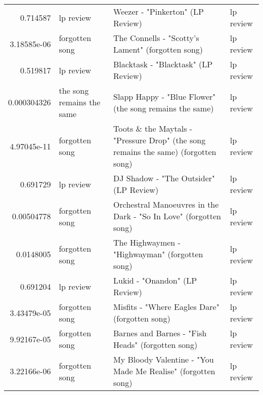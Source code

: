 \documentclass[letterpaper,10pt]{article}
\begin{document}
\begin{table}[H]
\begin{adjustbox}{max width=\linewidth}
\begin{tabular}{rlll}
  0.714587    & lp review                 & Weezer - "Pinkerton" (LP Review)                                                                             & lp review                 \\
  3.18585e-06 & forgotten song            & The Connells - "Scotty's Lament"  (forgotten song)                                                           & lp review                 \\
  0.519817    & lp review                 & Blacktask - "Blacktask" (LP Review)                                                                          & lp review                 \\
  0.000304326 & the song remains the same & Slapp Happy - "Blue Flower"  (the song remains the same)                                                     & lp review                 \\
  4.97045e-11 & forgotten song            & Toots \& the Maytals - "Pressure Drop"  (the song remains the same) (forgotten song)                          & lp review                 \\
  0.691729    & lp review                 & DJ Shadow - "The Outsider"  (LP Review)                                                                      & lp review                 \\
  0.00504778  & forgotten song            & Orchestral Manoeuvres in the Dark - "So In Love"  (forgotten song)                                           & lp review                 \\
  0.0148005   & forgotten song            & The Highwaymen - "Highwayman"  (forgotten song)                                                              & lp review                 \\
  0.691204    & lp review                 & Lukid - "Onandon"  (LP Review)                                                                               & lp review                 \\
  3.43479e-05 & forgotten song            & Misfits - "Where Eagles Dare"  (forgotten song)                                                              & lp review                 \\
  9.92167e-05 & forgotten song            & Barnes and Barnes - "Fish Heads"  (forgotten song)                                                           & lp review                 \\
  3.22166e-06 & forgotten song            & My Bloody Valentine - "You Made Me Realise"  (forgotten song)                                                & lp review                 \\

\end{tabular}
\end{adjustbox}
\end{table}
\end{document}
